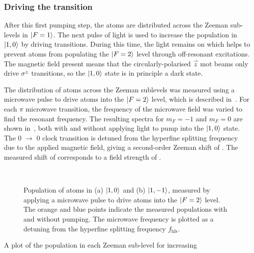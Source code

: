 \subsubsection{Driving the  transition}
After this first pumping step, the atoms are distributed across the
Zeeman sub-levels in \(\ket{F=1}\). The next pulse of light is used to
increase the population in \(\ket{1,0}\) by driving 
transitions. During this time, the  light remains on which
helps to prevent atoms from populating the \(\ket{F=2}\) level through
off-resonant  excitations. The magnetic field present
means that the circularly-polarised \(\vec{z}\) \ac{mot} beams only
drive \(\sigma^{\pm}\) transitions, so the \(\ket{1,0}\) state is in
principle a dark state. 
\par\noindent
The distribution of atoms across the Zeeman sublevels was measured
using a microwave pulse to drive atoms into the \(\ket{F=2}\) level,
which is described in~. For each \(\pi\)
microwave transition, the frequency of the microwave field was varied
to find the resonant frequency. The resulting spectra for \(m_F = -1\)
and \(m_F = 0\) are shown in~,
both with and without applying light to pump into the \(\ket{1,0}\)
state.  The 0 \(\rightarrow\) 0 clock transition is detuned from the
hyperfine splitting frequency due to the applied magnetic field,
giving a second-order Zeeman shift of
. The measured shift of
 corresponds to a field strength of
.
\begin{figure}[!htbp]
    \centering
    \def\svgwidth{\columnwidth}
    \\
    \caption[\(m_F\) populations before and after  pumping]{Population of atoms in (a) \(\ket{1,0}\) and (b) \(\ket{1,-1}\), measured by applying a  microwave pulse to drive atoms into the \(\ket{F=2}\) level. The orange and blue points indicate the measured populations with and without  pumping. The microwave frequency is plotted as a detuning from the hyperfine splitting frequency \(f_\text{hfs}\).}
    \label{fig:step2_microwave_spec}
\end{figure} 
\par\noindent
A plot of the population in each Zeeman sub-level for increasing
